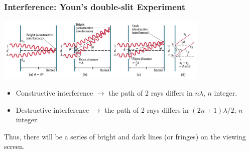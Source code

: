 \documentclass[]{beamer}
\begin{document}
\begin{frame}

\frametitle{Interference: Youn's double-slit Experiment}

  \begin{center}
  \includegraphics[height=1.2in]{images5/doubleslit2.jpg}
\end{center}

\pause


\begin{itemize}
\item Constructive interference $\rightarrow$ the path of 2 rays differs in $n \lambda$, $n$ integer.
\pause
\item Destructive interference $\rightarrow$ the path of 2 rays differs in  $(2n+1) \lambda/2$, $n$ integer.
\end{itemize}

\pause
\vspace{3mm}

Thus, there will be
a series of bright and dark lines (or fringes) on the viewing screen.

  \end{frame}



\end{document}
